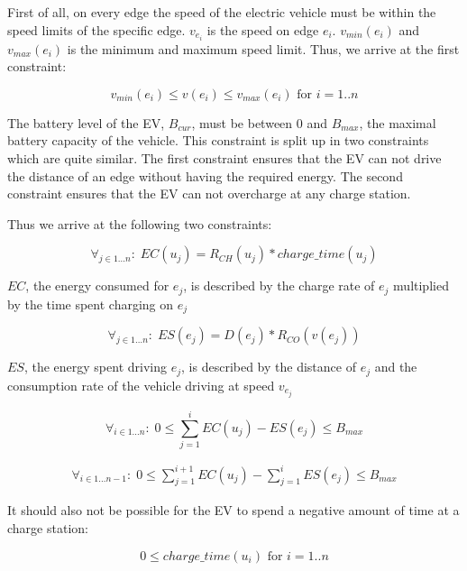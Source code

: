 First of all, on every edge the speed of the electric vehicle must be within the speed limits of the specific edge. $v_{e_i}$ is the speed on edge $e_i$. $v_{min}(e_i)$ and $v_{max}(e_i)$ is the minimum and maximum speed limit. Thus, we arrive at the first constraint:

\begin{equation}
    v_{min}(e_i) \leq v(e_i) \leq v_{max}(e_i) \text{ for } i = 1..n  
\end{equation}

The battery level of the EV, $B_{cur}$, must be between $0$ and $B_{max}$, the maximal battery capacity of the vehicle. This constraint is split up in two constraints which are quite similar. The first constraint ensures that the EV can not drive the distance of an edge without having the required energy. The second constraint ensures that the EV can not overcharge at any charge station. 

Thus we arrive at the following two constraints:

\begin{equation}
\forall_{j\in1 \dots n }:\; EC(u_j) = R_{CH}(u_j) * charge\_time(u_j)
\end{equation}

$EC$, the energy consumed for $e_j$, is described by the charge rate of $e_j$ multiplied by the time spent charging on $e_j$

\begin{equation}
\forall_{j\in1 \dots n }:\; ES(e_j) = D(e_j)*R_{CO}(v(e_j))
\end{equation} 

$ES$, the energy spent driving $e_j$, is described by the distance of $e_j$ and the consumption rate of the vehicle driving at speed $v_{e_j}$



\begin{equation}
\forall_{i\in1 \dots n }:\;0 \leq \sum_{j=1}^{i} EC(u_j) - ES(e_j) \leq B_{max} 
\end{equation}


\begin{equation}
\begin{aligned}
\forall_{i\in1 \dots n-1}:\;0 \leq \sum_{j=1}^{i+1} EC(u_j) - \sum_{j=1}^{i} ES(e_j) \leq B_{max} 
\end{aligned}
\end{equation}

It should also not be possible for the EV to spend a negative amount of time at a charge station:

\begin{equation}
0 \leq charge\_time(u_i) \text{ for } i = 1..n 
\end{equation}


